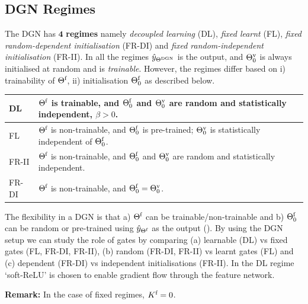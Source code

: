 \subsection{DGN Regimes}
\begin{definition}\label{rm:regime}The DGN has $\mathbf{4}$ \textbf{regimes} namely \emph{decoupled learning} (DL), \emph{fixed learnt} (FL), \emph{fixed random-dependent initialisation} (FR-DI) and \emph{fixed random-independent initialisation} (FR-II). 
In all the regimes $\hat{y}_{\Theta^{\text{DGN}}}$ is the output, and ${\Theta}^{\text{v}}_0$ is always initialised at random and is \emph{trainable}. However, the regimes differ based on i) trainability of $\Theta^{\textrm{f}}$, ii) initialisation $\Theta^{\textrm{f}}_0$ as described below.\\
\begin{tabular}{|l|p{6cm}|}\hline
DL               & $\Theta^{\textrm{f}}$ is trainable, and $\Theta^{\textrm{f}}_0$ and ${\Theta}^{\text{v}}_0$ are random and statistically independent,  $\beta>0$.\\\hline
FL               & $\Theta^{\textrm{f}}$ is non-trainable, and $\Theta^{\textrm{f}}_0$ is pre-trained;  ${\Theta}^{\text{v}}_0$ is statistically independent of $\Theta^{\textrm{f}}_0$. \\\hline
FR-II            & $\Theta^{\textrm{f}}$ is non-trainable, and $\Theta^{\textrm{f}}_0$ and ${\Theta}^{\text{v}}_0$ are random and statistically independent.\\\hline
FR-DI   &  $\Theta^{\textrm{f}}$ is non-trainable, and $\Theta^{\textrm{f}}_0={\Theta}^{\text{v}}_0$.\\\hline
\end{tabular}
\end{definition}
The flexibility in a DGN is that  a) $\Theta^{\textrm{f}}$ can be trainable/non-trainable and b) $\Theta^{\textrm{f}}_0$ can be random or pre-trained using $\hat{y}_{{\Theta}^{\text{f}}}$ as the output (). By using the DGN setup we can study the role of gates by comparing (a) learnable (DL) vs fixed gates (FL, FR-DI, FR-II), (b) random (FR-DI, FR-II) vs learnt gates (FL) and (c) dependent (FR-DI) vs independent initialisations (FR-II). In the DL regime `soft-ReLU' is chosen to enable gradient flow through the feature network.

\textbf{Remark:} In the case of fixed regimes, $K^{\text{f}}=0$. 
